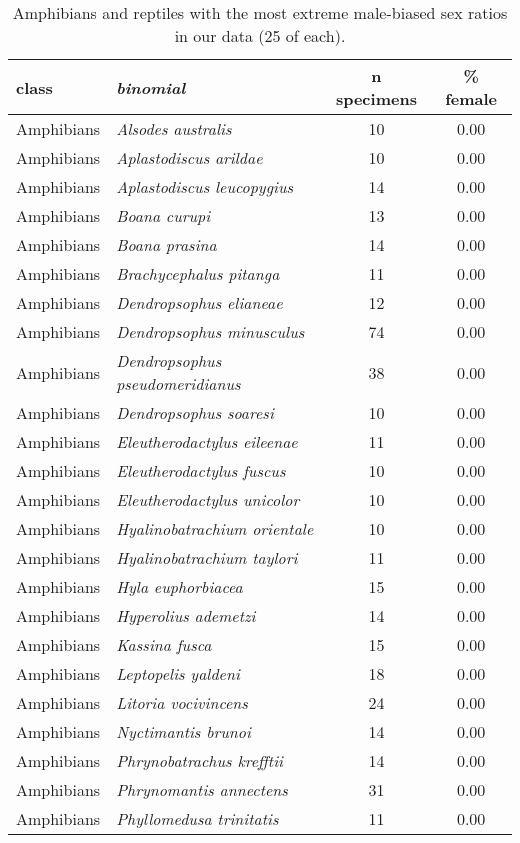 \begin{longtable}{l>{\itshape}lcc}
\caption{Amphibians and reptiles with the most extreme male-biased sex ratios
                  in our data (25 of each).} \\ 
  \hline
class & binomial & n specimens & \% female \\ 
  \hline
Amphibians & Alsodes australis &  10 & 0.00 \\ 
  Amphibians & Aplastodiscus arildae &  10 & 0.00 \\ 
  Amphibians & Aplastodiscus leucopygius &  14 & 0.00 \\ 
  Amphibians & Boana curupi &  13 & 0.00 \\ 
  Amphibians & Boana prasina &  14 & 0.00 \\ 
  Amphibians & Brachycephalus pitanga &  11 & 0.00 \\ 
  Amphibians & Dendropsophus elianeae &  12 & 0.00 \\ 
  Amphibians & Dendropsophus minusculus &  74 & 0.00 \\ 
  Amphibians & Dendropsophus pseudomeridianus &  38 & 0.00 \\ 
  Amphibians & Dendropsophus soaresi &  10 & 0.00 \\ 
  Amphibians & Eleutherodactylus eileenae &  11 & 0.00 \\ 
  Amphibians & Eleutherodactylus fuscus &  10 & 0.00 \\ 
  Amphibians & Eleutherodactylus unicolor &  10 & 0.00 \\ 
  Amphibians & Hyalinobatrachium orientale &  10 & 0.00 \\ 
  Amphibians & Hyalinobatrachium taylori &  11 & 0.00 \\ 
  Amphibians & Hyla euphorbiacea &  15 & 0.00 \\ 
  Amphibians & Hyperolius ademetzi &  14 & 0.00 \\ 
  Amphibians & Kassina fusca &  15 & 0.00 \\ 
  Amphibians & Leptopelis yaldeni &  18 & 0.00 \\ 
  Amphibians & Litoria vocivincens &  24 & 0.00 \\ 
  Amphibians & Nyctimantis brunoi &  14 & 0.00 \\ 
  Amphibians & Phrynobatrachus krefftii &  14 & 0.00 \\ 
  Amphibians & Phrynomantis annectens &  31 & 0.00 \\ 
  Amphibians & Phyllomedusa trinitatis &  11 & 0.00 \\ 

\end{longtable}
